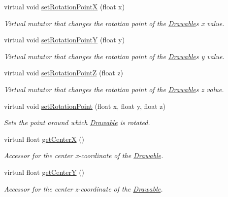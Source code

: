 \begin{DoxyCompactItemize}
virtual void \hyperlink{classtsgl_1_1_drawable_a7de462cb3293cba7beee25c8a0370891}{set\+Rotation\+PointX} (float x)
\begin{DoxyCompactList}\small\item\em Virtual mutator that changes the rotation point of the \hyperlink{classtsgl_1_1_drawable}{Drawable}\textquotesingle{}s x value. \end{DoxyCompactList}\item 
virtual void \hyperlink{classtsgl_1_1_drawable_a9576c059c277e1e936b5de228c0d59cf}{set\+Rotation\+PointY} (float y)
\begin{DoxyCompactList}\small\item\em Virtual mutator that changes the rotation point of the \hyperlink{classtsgl_1_1_drawable}{Drawable}\textquotesingle{}s y value. \end{DoxyCompactList}\item 
virtual void \hyperlink{classtsgl_1_1_drawable_a5293782ce59f1aff49defa38945ec6bb}{set\+Rotation\+PointZ} (float z)
\begin{DoxyCompactList}\small\item\em Virtual mutator that changes the rotation point of the \hyperlink{classtsgl_1_1_drawable}{Drawable}\textquotesingle{}s z value. \end{DoxyCompactList}\item 
virtual void \hyperlink{classtsgl_1_1_drawable_a9f99fff756caeac2e9f0cfa9cf30354f}{set\+Rotation\+Point} (float x, float y, float z)
\begin{DoxyCompactList}\small\item\em Sets the point around which \hyperlink{classtsgl_1_1_drawable}{Drawable} is rotated. \end{DoxyCompactList}\item 
virtual float \hyperlink{classtsgl_1_1_drawable_a170ce95eaae8b19532420e42e9eb8abf}{get\+CenterX} ()
\begin{DoxyCompactList}\small\item\em Accessor for the center x-\/coordinate of the \hyperlink{classtsgl_1_1_drawable}{Drawable}. \end{DoxyCompactList}\item 
virtual float \hyperlink{classtsgl_1_1_drawable_ad78d781f078bab0f458892757f100e7f}{get\+CenterY} ()
\begin{DoxyCompactList}\small\item\em Accessor for the center z-\/coordinate of the \hyperlink{classtsgl_1_1_drawable}{Drawable}. \end{DoxyCompactList}\item 

\end{DoxyCompactItemize}
